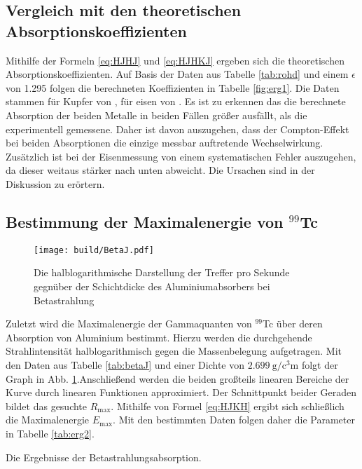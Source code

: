 \subsection{Vergleich mit den theoretischen Absorptionskoeffizienten}
Mithilfe der Formeln \ref{eq:HJHJ} und \ref{eq:HJHKJ} ergeben sich die theoretischen
Absorptionskoeffizienten. Auf Basis der Daten aus Tabelle \ref{tab:rohd} und einem
 $\epsilon$ von 1.295 \cite{V704} folgen die berechneten Koeffizienten in Tabelle \ref{fig:erg1}.
 Die Daten stammen für Kupfer von \cite{Kupfer}, für eisen von \cite{Eisen}.
Es ist zu erkennen das die berechnete Absorption der beiden Metalle in beiden
Fällen größer ausfällt, als die experimentell gemessene. Daher ist davon auszugehen,
dass der Compton-Effekt bei beiden Absorptionen die einzige messbar auftretende Wechselwirkung.
Zusätzlich ist bei der Eisenmessung von einem systematischen Fehler auszugehen,
da dieser weitaus stärker nach unten abweicht. Die Ursachen sind in der Diskussion zu erörtern.
\subsection{Bestimmung der Maximalenergie von $^{99}$Tc }


\begin{figure}
 \centering
 \caption{Die halblogarithmische Darstellung der Treffer pro Sekunde gegnüber der Schichtdicke des Aluminiumabsorbers bei Betastrahlung}
 \texttt{[image: build/BetaJ.pdf]}
 \label{fig:betaj}
\end{figure}

Zuletzt wird die Maximalenergie der Gammaquanten von $^{99}$Tc über deren Absorption von Aluminium bestimmt. Hierzu werden
die durchgehende Strahlintensität halblogarithmisch gegen die Massenbelegung aufgetragen.
Mit den Daten aus Tabelle \ref{tab:betaJ} und einer Dichte von $\SI{2.699}{\gram\per\cubic\centi\meter}$ folgt der Graph in Abb. \ref{fig:betaj}.Anschließend werden
die beiden großteils linearen Bereiche der Kurve durch linearen Funktionen approximiert. Der
 Schnittpunkt beider Geraden bildet das gesuchte $R_\text{max}$. Mithilfe von Formel \ref{eq:HJKH}
 ergibt sich schließlich die Maximalenergie $E_\text{max}$. Mit den bestimmten Daten folgen daher die Parameter in Tabelle \ref{tab:erg2}.
\begin{table}
 \centering
 \caption{Die Ergebnisse der Betastrahlungsabsorption.}
 
 \label{tab:erg2}
\end{table}
